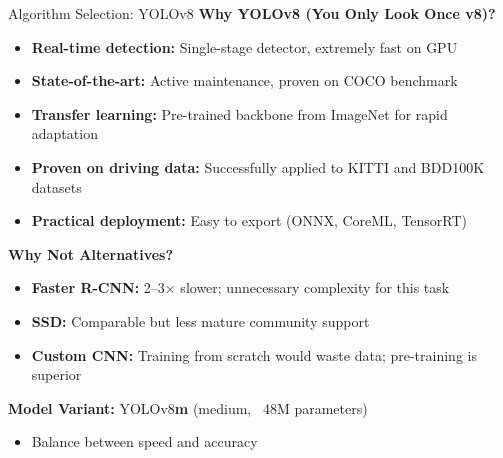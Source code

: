 \documentclass{beamer}
\begin{document}
\begin{frame}{Algorithm Selection: YOLOv8}
    \textbf{Why YOLOv8 (You Only Look Once v8)?}
    \begin{itemize}
        \item \textbf{Real-time detection:} Single-stage detector, extremely fast on GPU
        \item \textbf{State-of-the-art:} Active maintenance, proven on COCO benchmark
        \item \textbf{Transfer learning:} Pre-trained backbone from ImageNet for rapid adaptation
        \item \textbf{Proven on driving data:} Successfully applied to KITTI and BDD100K datasets
        \item \textbf{Practical deployment:} Easy to export (ONNX, CoreML, TensorRT)
    \end{itemize}

    \vspace{0.3cm}
    \textbf{Why Not Alternatives?}
    \begin{itemize}
        \item \textbf{Faster R-CNN:} 2--3× slower; unnecessary complexity for this task
        \item \textbf{SSD:} Comparable but less mature community support
        \item \textbf{Custom CNN:} Training from scratch would waste data; pre-training is superior
    \end{itemize}

    \vspace{0.3cm}
    \textbf{Model Variant:} YOLOv8\textbf{m} (medium, ~48M parameters)
    \begin{itemize}
        \item Balance between speed and accuracy
    \end{itemize}
\end{frame}
\end{document}
